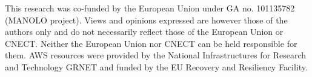 \documentclass[conference]{IEEEtran}
\begin{document}
This research was co-funded by the European Union under GA no. 101135782 (MANOLO project). Views and opinions expressed are however those of the authors only and do not necessarily reflect those of the European Union or CNECT. Neither the European Union nor CNECT can be held responsible for them.
AWS resources were provided by the National Infrastructures for Research and Technology GRNET and funded by the EU Recovery and Resiliency Facility.

\fi




\end{document}
